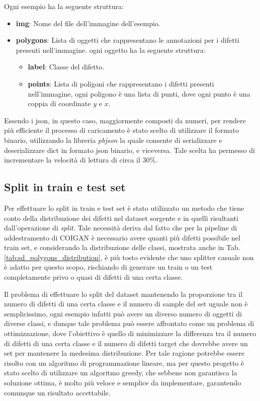 Ogni esempio ha la seguente struttura:
\begin{itemize}
    \item \textbf{img}: Nome del file dell'immagine dell'esempio.
    \item \textbf{polygons}: Lista di oggetti che rappresentano le annotazioni per i difetti presenti nell'immagine. ogni oggetto ha la seguente struttura:
    \begin{itemize}
        \item \textbf{label}: Classe del difetto.
        \item \textbf{points}: Lista di poligoni che rappresentano i difetti presenti nell'immagine, ogni poligono è una lista di punti, 
        dove ogni punto è una coppia di coordinate $y$ e $x$.
    \end{itemize}
\end{itemize}

Essendo i json, in questo caso, maggiormente composti da numeri, per rendere più efficiente il processo di caricamento è stato 
scelto di utilizzare il formato binario, utilizzando la libreria \textit{pbjson} la quale consente di serializzare e deserializzare
dict in formato json binario, e viceversa. Tale scelta ha permesso di incrementare la velocità di lettura di circa il 30\%.

\subsection{Split in train e test set}
Per effettuare lo split in train e test set è stato utilizzato un metodo che tiene conto della distribuzione 
dei difetti nel dataset sorgente e in quelli risultanti dall'operazione di \textit{split}.
Tale necessità deriva dal fatto che per la pipeline di addestramento di COIGAN è necessario avere quanti più difetti possibile nel train set,
e considerando la distribuzione delle classi, mostrata anche in Tab. \ref{tab:sd_polygons_distribution}, è più tosto evidente che uno splitter
casuale non è adatto per questo scopo, rischiando di generare un train o un test completamente privo o quasi di difetti di una certa classe.

Il problema di effettuare lo split del dataset mantenendo la proporzione tra il numero di difetti di una certa classe e il numero di sample del
set uguale non è semplicissimo, ogni esempio infatti può avere un diverso numero di oggetti di diverse classi, e dunque tale problema può 
essere affrontato come un problema di ottimizzazione, dove l'obiettivo è quello di minimizzare la differenza
tra il numero di difetti di una certa classe e il numero di difetti target che dovrebbe avere un set per mantenere la medesima distribuzione. 
Per tale ragione potrebbe essere risolto con un algoritmo di programmazione lineare, ma per questo progetto è stato scelto 
di utilizzare un algoritmo greedy, che sebbene non garantisca la soluzione ottima, è molto più veloce e semplice da implementare, 
garantendo comunque un risultato accettabile.


